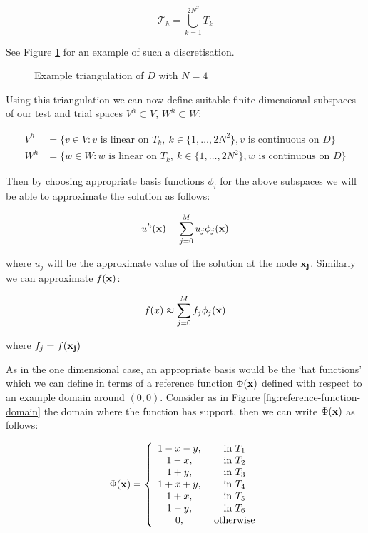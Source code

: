 \[
    \mathcal{T}_h = \bigcup_{k=1}^{2N^2} T_k
\]

See Figure \ref{fig:two-d-discretisation} for an example of such a
discretisation.

\begin{figure}
\centering

\caption{Example triangulation of $D$ with $N = 4$}
\label{fig:two-d-discretisation}
\end{figure}

Using this triangulation we can now define suitable finite dimensional subspaces
of our test and trial spaces $V^h \subset V$, $W^h \subset W$:

\begin{align*}
    V^h &= \{v \in V: v \text{ is linear on } T_k,\ k \in \{1,\ldots,2N^2\},
                     v \text{ is continuous on } D\} \\
    W^h &= \{w \in W: w \text{ is linear on } T_k,\ k \in \{1,\ldots,2N^2\},
                     w \text{ is continuous on } D\}
\end{align*}

Then by choosing appropriate basis functions $\phi_i$ for the above subspaces
we will be able to approximate the solution as follows:

\begin{equation}
    u^h(\mathbf{x}) = \sum_{j=0}^Mu_j\phi_j(\mathbf{x})
\end{equation}

where $u_j$ will be the approximate value of the solution at the node $\mathbf{x_j}$.
Similarly we can approximate $f(\mathbf{x})$:

\begin{equation}
    f(x) \approx \sum_{j=0}^Mf_j\phi_j(\mathbf{x})
\end{equation}

where $f_j = f(\mathbf{x_j})$

As in the one dimensional case, an appropriate basis would be the `hat
functions' which we can define in terms of a reference function $\Phi(\mathbf{x})$
defined with respect to an example domain around $(0,0)$.  Consider as in
Figure \ref{fig:reference-function-domain} the domain where the function has
support, then we can write $\Phi(\mathbf{x})$ as follows:

\begin{equation}\label{eq:two-d-ref-basis-fn}
    \Phi(\mathbf{x}) = \left\{\begin{array}{c c}
                    1 - x - y, & \text{ in } T_1 \\
                    1 - x,       & \text{ in } T_2 \\
                    1 + y,       & \text{ in } T_3 \\
                    1 + x + y,   & \text{ in } T_4 \\
                    1 + x,       & \text{ in } T_5 \\
                    1 - y,       & \text{ in } T_6 \\
                    0,           & \text{ otherwise}
                  \end{array}\right.
\end{equation}

